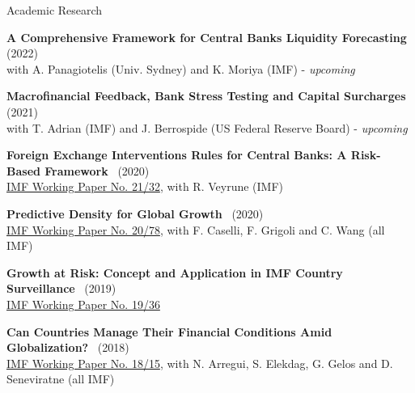 \documentclass[usegeometry, 10pt, a4paper]{cv} %
\newcommand{\activite}[1]{\textbf{#1}\ }
\begin{document}
\begin{rubriquetableau}[0.95\textwidth]{Academic Research}\\
  \vspace{-0.5cm}

\activite{A Comprehensive Framework for Central Banks Liquidity Forecasting} (2022) \\
\hspace{0.6cm} \small{with A. Panagiotelis (Univ. Sydney) and K. Moriya (IMF) - \emph{upcoming}}
\vspace{0.4cm} 

  
\activite{Macrofinancial Feedback, Bank Stress Testing and Capital Surcharges} (2021) \\
\hspace{0.6cm} \small{with T. Adrian (IMF) and J. Berrospide (US Federal
  Reserve Board) - \emph{upcoming}}
\vspace{0.4cm} 
  
\activite{Foreign Exchange Interventions Rules for Central Banks: A Risk-Based Framework} (2020) \\
\hspace{0.6cm} \small{\href{https://www.imf.org/en/Publications/WP/Issues/2021/02/12/Foreign-Exchange-Intervention-Rules-for-Central-Banks-A-Risk-based-Framework-50081}{IMF Working Paper No. 21/32}, with R. Veyrune (IMF)}
\vspace{0.4cm} 
  

\activite{Predictive Density for Global Growth} (2020) \\
\hspace{0.6cm} \small{\href{https://www.imf.org/en/Publications/WP/Issues/2020/05/29/Predictive-Density-Aggregation-A-Model-for-Global-GDP-Growth-49441}{IMF Working Paper No. 20/78}, with F. Caselli, F. Grigoli and C. Wang (all IMF)}
\vspace{0.4cm} 

  
\activite{Growth at Risk: Concept and Application in IMF Country Surveillance} (2019) \\
\hspace{0.6cm} \small{\href{https://www.imf.org/en/Publications/WP/Issues/2019/02/21/Growth-at-Risk-Concept-and-Application-in-IMF-Country-Surveillance-46567}{IMF Working Paper No. 19/36}}
\vspace{0.4cm} 

\activite{Can Countries Manage Their Financial Conditions Amid Globalization?} (2018) \\
\hspace{0.6cm} \small{\href{https://www.imf.org/en/Publications/WP/Issues/2018/01/24/Can-Countries-Manage-Their-Financial-Conditions-Amid-Globalization-45581}{IMF Working Paper No. 18/15}, with N. Arregui, S. Elekdag, G. Gelos and D. Seneviratne (all IMF)}
\vspace{0.4cm} 


\end{rubriquetableau}
\end{document}
